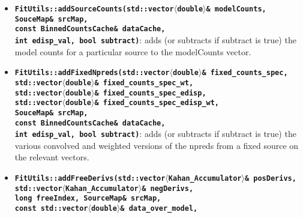 \documentclass[preprint]{aastex}
\begin{document}
\begin{itemize}
{    This implementation is used when energy dispersion adjacent bins method is used for energy dispersion..}
\item{ {\bf {\tt FitUtils::addSourceCounts(std::vector$\langle$double$\rangle$\& modelCounts,  \\ \hspace{1in}
        SouceMap\& srcMap, \\ \hspace{1in}
        const BinnedCountsCache\& dataCache, \\ \hspace{1in}
        int edisp\_val, bool subtract)}}: adds (or subtracts if subtract is true)
    the model counts for a particular source to the modelCounts vector.}
\item{ {\bf {\tt FitUtils::addFixedNpreds(std::vector$\langle$double$\rangle$\& fixed\_counts\_spec,   \\ \hspace{1in}
        std::vector$\langle$double$\rangle$\& fixed\_counts\_spec\_wt, \\ \hspace{1in}
        std::vector$\langle$double$\rangle$\& fixed\_counts\_spec\_edisp, \\ \hspace{1in}
        std::vector$\langle$double$\rangle$\& fixed\_counts\_spec\_edisp\_wt, \\ \hspace{1in}
        SouceMap\& srcMap, \\ \hspace{1in}
        const BinnedCountsCache\& dataCache,  \\ \hspace{1in}
        int edisp\_val, bool subtract)}}: adds (or subtracts if subtract is true)
    the various convolved and weighted versions of the npreds from a fixed source on the relevant vectors.}
\item{ {\bf {\tt FitUtils::addFreeDerivs(std::vector$\langle$Kahan\_Accumulator$\rangle$\& posDerivs,  \\ \hspace{1in}
        std::vector$\langle$Kahan\_Accumulator$\rangle$\& negDerivs,  \\ \hspace{1in}
        long freeIndex, SourceMap\& srcMap, \\ \hspace{1in}
        const std::vector$\langle$double$\rangle$\& data\_over\_model,  \\ \hspace{1in}
}}}
\end{itemize}
\end{document}
